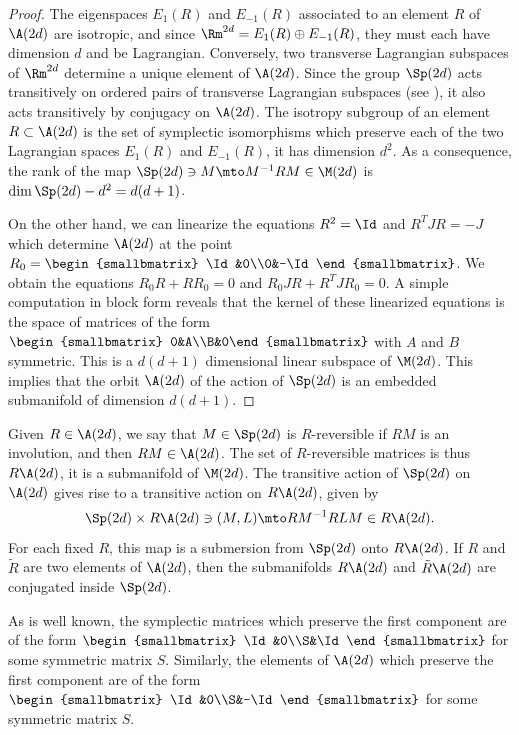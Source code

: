 \begin{proof}
The eigenspaces $E_1(R)$ and $E_{-1}(R)$ associated to
an element $R$ of $\A(2d)$ are isotropic, and since $\Rm^{2d}=E_1(R)\oplus E_{-1}(R)$,
they must each have dimension $d$ and be Lagrangian.
Conversely, two transverse Lagrangian subspaces of $\Rm^{2d}$ determine a unique element of $\A(2d)$. Since the group $\Sp(2d)$ acts transitively on ordered pairs of transverse Lagrangian subspaces
(see \eg \cite[Th.\,1.26]{dG}), it also acts transitively by conjugacy on $\A(2d)$. The isotropy subgroup of an element $R\subset \A(2d)$ is the set of symplectic isomorphisms which preserve each of the two Lagrangian spaces $E_1(R)$ and $E_{-1}(R)$, it has dimension $d^2$. As a consequence, the rank of the map $\Sp(2d)\ni M\mto M^{-1}RM\in \M(2d)$ is $\dim \Sp(2d)-d^2=d(d+1)$.

On the other hand, we can linearize the equations $R^2=\Id$ and $R^TJR=-J$ which determine $\A(2d)$ at the point
$R_0=\begin{smallbmatrix} \Id&0\\0&-\Id\end{smallbmatrix}$.
We obtain the equations $R_0R+RR_0=0$ and $R_0JR+R^TJR_0=0$.
A simple computation in block form reveals that the kernel of these linearized equations is the space of matrices of the form
$\begin{smallbmatrix} 0&A\\B&0\end{smallbmatrix}$ with $A$ and $B$ symmetric.
This is a $d(d+1)$ dimensional linear subspace of $\M(2d)$. This implies that the orbit $\A(2d)$ of the action of $\Sp(2d)$ is an embedded submanifold of dimension $d(d+1)$.
\end{proof}

Given $R\in \A(2d)$, we say that $M\in \Sp(2d)$ is $R$-reversible if $RM$ is an involution, and then $RM\in \A(2d)$. The set of $R$-reversible matrices is thus $R\A(2d)$, it is a submanifold of $\M(2d)$. The transitive action of $\Sp(2d)$ on $\A(2d)$
gives rise to a transitive action on $R\A(2d)$, given by
\[
\Sp(2d)\times R\A(2d) \ni(M, L)\mto RM^{-1}RLM\in R\A(2d).
\]
For each fixed $R$, this map is a submersion from $\Sp(2d)$ onto $R\A(2d)$.
If $R$ and $\tilde R$ are two elements of $\A(2d)$, then the submanifolds $R\A(2d)$ and $\tilde R\A(2d)$ are conjugated inside $\Sp(2d)$.

As is well known, the symplectic matrices which preserve the first component are of the form $\begin{smallbmatrix} \Id&0\\S&\Id\end{smallbmatrix}$ for some symmetric matrix $S$. Similarly,
the elements of $\A(2d)$
which preserve the first component are of the form $\begin{smallbmatrix} \Id&0\\S&-\Id\end{smallbmatrix}$ for some symmetric matrix $S$.

